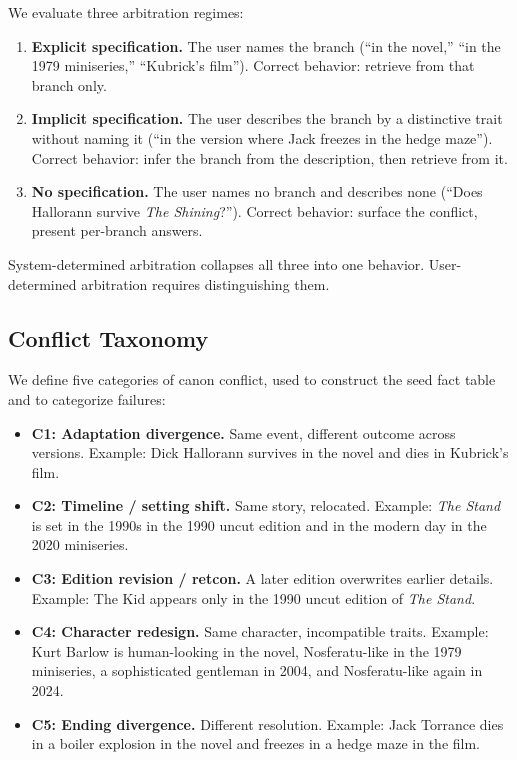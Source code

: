 \documentclass[conference]{IEEEtran}
\begin{document}
We evaluate three arbitration regimes:
\begin{enumerate}
\item \textbf{Explicit specification.} The user names the branch (``in the novel,'' ``in the 1979 miniseries,'' ``Kubrick's film''). Correct behavior: retrieve from that branch only.
\item \textbf{Implicit specification.} The user describes the branch by a distinctive trait without naming it (``in the version where Jack freezes in the hedge maze''). Correct behavior: infer the branch from the description, then retrieve from it.
\item \textbf{No specification.} The user names no branch and describes none (``Does Hallorann survive \textit{The Shining}?''). Correct behavior: surface the conflict, present per-branch answers.
\end{enumerate}

System-determined arbitration collapses all three into one behavior. User-determined arbitration requires distinguishing them.

\subsection{Conflict Taxonomy}

We define five categories of canon conflict, used to construct the seed fact table and to categorize failures:
\begin{itemize}
\item \textbf{C1: Adaptation divergence.} Same event, different outcome across versions. Example: Dick Hallorann survives in the novel and dies in Kubrick's film.
\item \textbf{C2: Timeline / setting shift.} Same story, relocated. Example: \textit{The Stand} is set in the 1990s in the 1990 uncut edition and in the modern day in the 2020 miniseries.
\item \textbf{C3: Edition revision / retcon.} A later edition overwrites earlier details. Example: The Kid appears only in the 1990 uncut edition of \textit{The Stand}.
\item \textbf{C4: Character redesign.} Same character, incompatible traits. Example: Kurt Barlow is human-looking in the novel, Nosferatu-like in the 1979 miniseries, a sophisticated gentleman in 2004, and Nosferatu-like again in 2024.
\item \textbf{C5: Ending divergence.} Different resolution. Example: Jack Torrance dies in a boiler explosion in the novel and freezes in a hedge maze in the film.
\end{itemize}
\end{document}
